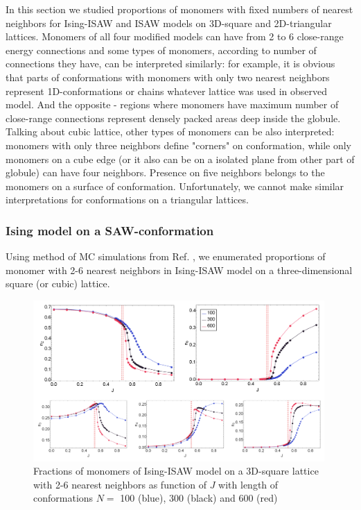 \documentclass[aps,pre,amssymb,amsmath,twocolumn,floatfix]{revtex4-2}
\begin{document}
In this section we studied proportions of monomers with fixed numbers of nearest neighbors for Ising-ISAW and ISAW models on 3D-square and 2D-triangular lattices. Monomers of all four modified models can have from 2 to 6 close-range energy connections and some types of monomers, according to number of connections they have, can be interpreted similarly: for example, it is obvious that parts of conformations with monomers with only two nearest neighbors represent 1D-conformations or chains whatever lattice was used in observed model. And the opposite - regions where monomers have maximum number of close-range connections represent densely packed areas deep inside the globule. Talking about cubic lattice, other types of monomers can be also interpreted: monomers with only three neighbors define "corners" on conformation, while only monomers on a cube edge (or it also can be on a isolated plane from other part of globule) can have four neighbors. Presence on five neighbors belongs to the monomers on a surface of conformation. Unfortunately, we cannot make similar interpretations for conformations on a triangular lattices.

\subsubsection{Ising model on a SAW-conformation}

Using method of MC simulations from Ref. \cite{faizullina2021critical}, we enumerated proportions of monomer with 2-6 nearest neighbors in Ising-ISAW model on a three-dimensional square (or cubic) lattice.

\begin{figure}
    \centering
    \includegraphics[keepaspectratio=True, width=0.99\textwidth]{Images/Ising3D_Complex.png}
    \caption{Fractions of monomers of Ising-ISAW model on a 3D-square lattice with 2-6 nearest neighbors as function of $J$ with length of conformations $N = $ 100 (blue), 300 (black) and 600 (red)}
    \label{fig:Ising3D}
\end{figure}
\end{document}
